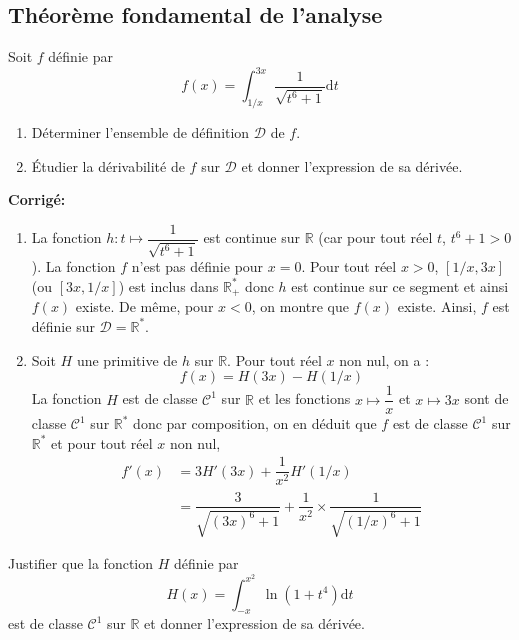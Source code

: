 \documentclass[a4paper,twoside,french,11pt]{VcCours}
\newcommand{\dt}{\text{d}t}
\newcommand{\corr}{\textbf{Corrigé:}}
\begin{document}

\tableofcontents
\separationTitre


\subsection{Théorème fondamental de l'analyse}


\begin{Exercice}{} Soit $f$ définie par 
$$f(x) = \int_{1/x}^{3x}\frac{1}{\sqrt{t^6+1}}\dt$$ 
\begin{enumerate}
\item Déterminer l'ensemble de définition $\mathcal{D}$ de $f$.
\item Étudier la dérivabilité de $f$ sur $\mathcal{D}$ et donner l'expression de sa dérivée.
\end{enumerate}
\end{Exercice} 

\corr 

\begin{enumerate}
\item La fonction $h : t \mapsto \dfrac{1}{\sqrt{t^6+1}}$ est continue sur $\mathbb{R}$ (car pour tout réel $t$, $t^6+1>0$). La fonction $f$ n'est pas définie pour $x=0$. Pour tout réel $x>0$, $[1/x,3x]$ (ou $[3x, 1/x]$) est inclus dans $\mathbb{R}_+^*$ donc $h$ est continue sur ce segment et ainsi $f(x)$ existe.  De même, pour $x<0$, on montre que $f(x)$ existe. Ainsi, $f$ est définie sur $\mathcal{D} = \mathbb{R}^*$.
\item Soit $H$ une primitive de $h$ sur $\mathbb{R}$. Pour tout réel $x$ non nul, on a :
$$ f(x) = H(3x)-H(1/x)$$
La fonction $H$ est de classe $\mathcal{C}^1$ sur $\mathbb{R}$ et les fonctions $x \mapsto \dfrac{1}{x}$ et $x \mapsto 3x$ sont de classe $\mathcal{C}^1$ sur $\mathbb{R}^*$ donc par composition, on en déduit que $f$ est de classe $\mathcal{C}^1$ sur $\mathbb{R}^*$ et pour tout réel $x$ non nul,
\begin{align*}
f'(x) & = 3 H'(3x)  + \dfrac{1}{x^2} H'(1/x) \\
& = \dfrac{3}{\sqrt{(3x)^6+1}} + \dfrac{1}{x^2} \times \dfrac{1}{\sqrt{(1/x)^6+1}} 
\end{align*}
\end{enumerate}

\begin{Exercice}{} Justifier que la fonction $H$ définie par 
$$H(x) = \int_{-x}^{x^2} \ln(1+t^4) \dt$$
est de classe $\mathcal{C}^1$ sur $\mathbb{R}$ et donner l'expression de sa dérivée.
\end{Exercice}
\end{document}
